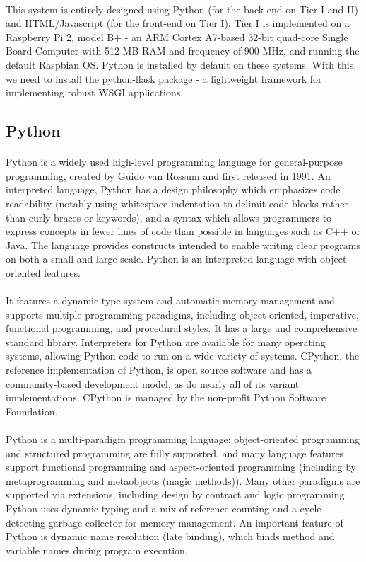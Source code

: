\paragraph{}
This system is entirely designed using Python (for the back-end on Tier I and II) and HTML/Javascript (for the front-end on Tier I). Tier I is implemented on a Raspberry Pi 2, model B+ - an ARM Cortex A7-based 32-bit quad-core Single Board Computer with 512 MB RAM and frequency of 900 MHz, and running the default Raspbian OS. Python is installed by default on these systems. With this, we need to install the python-flask package - a lightweight framework for implementing robust WSGI applications.

\subsection{Python}
\paragraph{}
Python is a widely used high-level programming language for general-purpose programming, created by Guido van Rossum and first released in 1991. An interpreted language, Python has a design philosophy which emphasizes code readability (notably using whitespace indentation to delimit code blocks rather than curly braces or keywords), and a syntax which allows programmers to express concepts in fewer lines of code than possible in languages such as C++ or Java. The language provides constructs intended to enable writing clear programs on both a small and large scale. Python is an interpreted language with object oriented features.
\paragraph{}
It features a dynamic type system and automatic memory management and supports multiple programming paradigms, including object-oriented, imperative, functional programming, and procedural styles. It has a large and comprehensive standard library. Interpreters for Python are available for many operating systems, allowing Python code to run on a wide variety of systems. CPython, the reference implementation of Python, is open source software and has a community-based development model, as do nearly all of its variant implementations. CPython is managed by the non-profit Python Software Foundation.
\paragraph{}
Python is a multi-paradigm programming language: object-oriented programming and structured programming are fully supported, and many language features support functional programming and aspect-oriented programming (including by metaprogramming and metaobjects (magic methods)). Many other paradigms are supported via extensions, including design by contract and logic programming. Python uses dynamic typing and a mix of reference counting and a cycle-detecting garbage collector for memory management. An important feature of Python is dynamic name resolution (late binding), which binds method and variable names during program execution.
